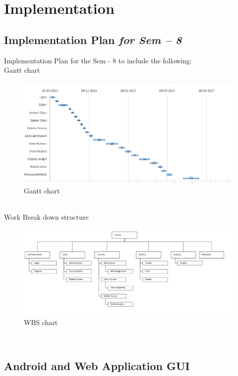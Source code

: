 \chapter{Implementation}


\section{Implementation Plan \textit{for Sem – 8}}
Implementation Plan for the Sem - 8 to include the following:\\
Gantt chart
\begin{figure}[h]
	\centering
    \hfill\includegraphics[scale=.85,angle=360]{project/images/Capture}\hspace{\fill}
    \caption{Gantt chart}
\end{figure}\\
\newpage
Work Break down structure \\ 
\begin{figure}[h]
	\centering
    \hfill\includegraphics[scale=.60,angle=360]{project/images/wbs}\hspace{\fill}
    \caption{WBS chart}
\end{figure}\\

\section{Android and Web Application GUI}
